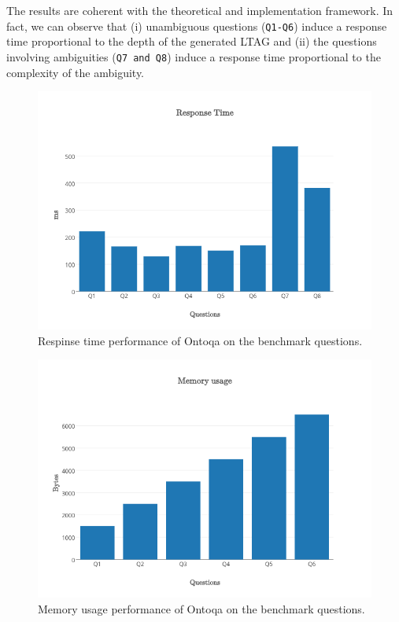 The results are coherent with the theoretical and implementation framework. In fact, we can observe that (i) unambiguous questions (\texttt{Q1-Q6}) induce a response time proportional to the depth of the generated LTAG and (ii) the questions involving ambiguities (\texttt{Q7 and Q8}) induce a response time proportional to the complexity of the ambiguity.

\begin{figure}[tp]
	\centering
	\includegraphics[width=0.8\columnwidth]{./fig/evaluation-response-time}
	\caption{Respinse time performance of Ontoqa on the benchmark questions.}
	\label{fig:evaluation-time}
\end{figure}

\begin{figure}[tp]
	\centering
	\includegraphics[width=0.8\columnwidth]{./fig/evaluation-memory-usage}
	\caption{Memory usage performance of Ontoqa on the benchmark questions.}
	\label{fig:evaluation-memory}
\end{figure}